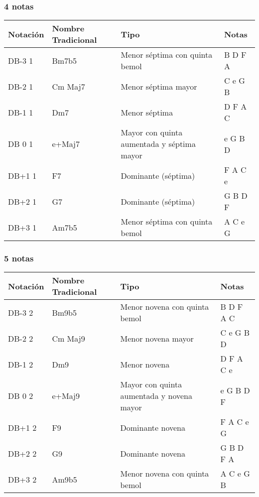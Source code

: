 \documentclass[]{report}
\begin{document}
\subsubsection*{4 notas}

\begin{table}[H]
  \centering
  \begin{tabularx}{\textwidth}{ll>{\raggedright\arraybackslash}Xl}
\toprule
Notación & Nombre Tradicional & Tipo & Notas \\
\midrule
\textsf{DB-3} 1 & Bm7b5   & Menor séptima con quinta bemol & B D F A \\
\textsf{DB-2} 1 & Cm Maj7 & Menor séptima mayor & C e G B \\
\textsf{DB-1} 1 & Dm7     & Menor séptima & D F A C \\
\textsf{DB 0} 1 & e+Maj7  & Mayor con quinta aumentada y séptima mayor & e G B D \\
\textsf{DB+1} 1 & F7      & Dominante (séptima) & F A C e \\
\textsf{DB+2} 1 & G7      & Dominante (séptima) & G B D F \\
\textsf{DB+3} 1 & Am7b5   & Menor séptima con quinta bemol & A C e G \\
\bottomrule
\end{tabularx}
\end{table}

\subsubsection*{5 notas}

\begin{table}[H]
  \centering
  \begin{tabularx}{\textwidth}{ll>{\raggedright\arraybackslash}Xl}
\toprule
Notación & Nombre Tradicional & Tipo & Notas \\
\midrule
\textsf{DB-3} 2 & Bm9b5   & Menor novena con quinta bemol & B D F A C \\
\textsf{DB-2} 2 & Cm Maj9 & Menor novena mayor & C e G B D \\
\textsf{DB-1} 2 & Dm9     & Menor novena & D F A C e \\
\textsf{DB 0} 2 & e+Maj9  & Mayor con quinta aumentada y novena mayor & e G B D F \\
\textsf{DB+1} 2 & F9      & Dominante novena & F A C e G \\
\textsf{DB+2} 2 & G9      & Dominante novena & G B D F A \\
\textsf{DB+3} 2 & Am9b5   & Menor novena con quinta bemol & A C e G B \\
\bottomrule
\end{tabularx}
\end{table}
\end{document}
